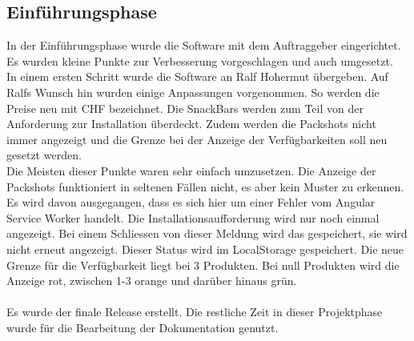  \subsection{Einführungsphase}
 In der Einführungsphase wurde die Software mit dem Auftraggeber eingerichtet. Es wurden kleine Punkte zur Verbesserung vorgeschlagen und auch umgesetzt. \\
 In einem ersten Schritt wurde die Software an Ralf Hohermut übergeben. Auf Ralfs Wunsch hin wurden einige Anpassungen vorgenommen. So werden die Preise neu mit CHF bezeichnet. Die SnackBars werden zum Teil von der Anforderung zur Installation überdeckt. Zudem werden die Packshots nicht immer angezeigt und die Grenze bei der Anzeige der Verfügbarkeiten soll neu gesetzt werden. \\
 Die Meisten dieser Punkte waren sehr einfach umzusetzen. Die Anzeige der Packshots funktioniert in seltenen Fällen nicht, es aber kein Muster zu erkennen. Es wird davon ausgegangen, dass es sich hier um einer Fehler vom Angular Service Worker handelt. Die Installationsaufforderung wird nur noch einmal angezeigt. Bei einem Schliessen von dieser Meldung wird das gespeichert, sie wird nicht erneut angezeigt. Dieser Status wird im \gls{LocalStorage} gespeichert. Die neue Grenze für die Verfügbarkeit liegt bei 3 Produkten. Bei null Produkten wird die Anzeige rot, zwischen 1-3 orange und darüber hinaus grün. \\\\
 Es wurde der finale Release erstellt. Die restliche Zeit in dieser Projektphase wurde für die Bearbeitung der Dokumentation genutzt. 


\newpage

